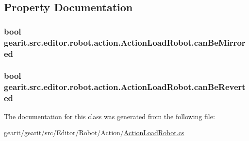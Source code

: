 \subsection{Property Documentation}
\hypertarget{classgearit_1_1src_1_1editor_1_1robot_1_1action_1_1_action_load_robot_a7b216c6a65cb62d3dbb51b1e1835f9a8}{
\subsubsection[{can\+Be\+Mirrored}]{\setlength{\rightskip}{0pt plus 5cm}bool gearit.\+src.\+editor.\+robot.\+action.\+Action\+Load\+Robot.\+can\+Be\+Mirrored\hspace{0.3cm}{\ttfamily [get]}}}\label{classgearit_1_1src_1_1editor_1_1robot_1_1action_1_1_action_load_robot_a7b216c6a65cb62d3dbb51b1e1835f9a8}
\hypertarget{classgearit_1_1src_1_1editor_1_1robot_1_1action_1_1_action_load_robot_a01c1977199ba3a4c440f181a59929634}{
\subsubsection[{can\+Be\+Reverted}]{\setlength{\rightskip}{0pt plus 5cm}bool gearit.\+src.\+editor.\+robot.\+action.\+Action\+Load\+Robot.\+can\+Be\+Reverted\hspace{0.3cm}{\ttfamily [get]}}}\label{classgearit_1_1src_1_1editor_1_1robot_1_1action_1_1_action_load_robot_a01c1977199ba3a4c440f181a59929634}


The documentation for this class was generated from the following file\+:\begin{DoxyCompactItemize}
\item 
gearit/gearit/src/\+Editor/\+Robot/\+Action/\hyperlink{_action_load_robot_8cs}{Action\+Load\+Robot.\+cs}\end{DoxyCompactItemize}
